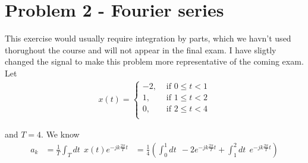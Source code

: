 \section*{Problem 2 - Fourier series}
This exercise would usually require integration by parts, which we havn't used 
thorughout the course and will not appear in the final exam. I have sligtly 
changed the signal to make this problem more representative of the coming exam.
Let 
\begin{align}
    x(t) = \begin{cases}
        -2, &\text{ if }0\leq t < 1\\
        1, &\text{ if }1\leq t < 2\\
        0, &\text{ if }2\leq t < 4\\        
    \end{cases}
\end{align}

and $T = 4$. We know 
\begin{align}
    a_k &= \frac{1}{T}\int_T dt \ \ x(t)e^{-jk\frac{2\pi}{T}t}
        &= \frac{1}{4} (\int_0^1 dt \ \ -2 e^{-jk\frac{2\pi}{T}t} 
            + \int_1^2 dt \ \ e^{-jk\frac{2\pi}{T}t})
\end{align}
